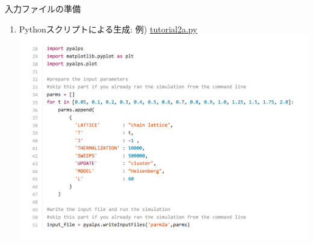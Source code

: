 \begin{frame}[t,fragile]{入力ファイルの準備}
  \begin{enumerate}
    \setlength{\itemsep}{1em}
  \item Pythonスクリプトによる生成: 例) \href{https://github.com/cmsi/alps-tutorial/blob/tutorials/tutorials/mc-02-susceptibilities/tutorial2a.py}{tutorial2a.py}
      \includegraphics[height=.72\textheight]{tutorial2a-1.pdf}
  \end{enumerate}
\end{frame}


